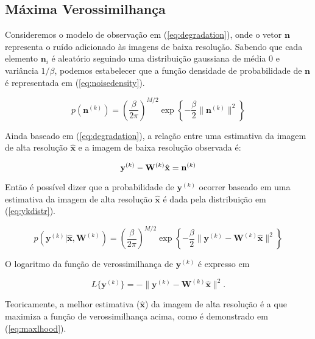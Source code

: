 \subsection{Máxima Verossimilhança}
\label{sec:metodosprob}

Consideremos o modelo de observação em (\ref{eq:degradation}), onde o vetor
$\mathbf{n}$ representa o ruído adicionado às imagens de baixa resolução.
Sabendo que cada elemento $\mathbf{n}_i$ é aleatório seguindo uma distribuição
gaussiana de média 0 e variância $1/\beta$, podemos estabelecer que a função
densidade de probabilidade de $\mathbf{n}$ é representada em (\ref{eq:noisedensity}).

\begin{equation}
	\label{eq:noisedensity}
	p(\mathbf{n}^{(k)}) = \left(\frac{ \beta}{2\pi} \right)^{M/2}
	\exp{\left\{  -  \frac{\beta}{2}\|\mathbf{n}^{(k)}\|^2 \right\}}
\end{equation}

Ainda baseado em (\ref{eq:degradation}), a relação entre uma estimativa da imagem de alta resolução $\hat{\mathbf{x}}$ e a imagem de baixa resolução observada é:

\begin{equation}
	\mathbf{y}^{(k)} - \mathbf{W}^{(k)}\hat{\mathbf{x}} =  \mathbf{n}^{(k)} \\
\end{equation}

Então é possível dizer que a probabilidade de $\mathbf{y}^{(k)}$ ocorrer baseado em uma estimativa da imagem de alta resolução $\hat{\mathbf{x}}$ é dada pela distribuição em (\ref{eq:ykdistr}).

\begin{equation}
	\label{eq:ykdistr}
	p(\mathbf{y}^{(k)} | \hat{\mathbf{x}}, \mathbf{W}^{(k)}) = \left(\frac{ \beta}{2\pi} \right)^{M/2}
	\exp{\left\{-\frac{\beta}{2}\|\mathbf{y}^{(k)} - \mathbf{W}^{(k)}\hat{\mathbf{x}}\|^2 \right\}}
\end{equation}

O logaritmo da função de verossimilhança de $\mathbf{y}^{(k)}$ é expresso em

\begin{equation}
	L\{\mathbf{y}^{(k)}\} = -\|\mathbf{y}^{(k)} - \mathbf{W}^{(k)}\hat{\mathbf{x}}\|^2.
\end{equation}

Teoricamente, a melhor estimativa ($\hat{\mathbf{x}}$) da imagem de alta resolução é a
que maximiza a função de verossimilhança acima, como é demonstrado em (\ref{eq:maxlhood}).

